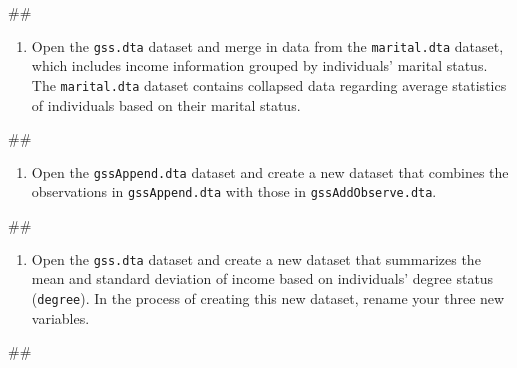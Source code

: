 \documentclass[
]{book}
\newenvironment{Shaded}{\begin{snugshade}}{\end{snugshade}}
\newcommand{\NormalTok}[1]{#1}
\providecommand{\tightlist}{%
  \setlength{\itemsep}{0pt}\setlength{\parskip}{0pt}}
\begin{document}
\begin{Shaded}
\begin{Highlighting}[]
\NormalTok{\#\#}
\end{Highlighting}
\end{Shaded}

\begin{enumerate}
\def\labelenumi{\arabic{enumi}.}
\setcounter{enumi}{1}
\tightlist
\item
  Open the \texttt{gss.dta} dataset and merge in data from the \texttt{marital.dta} dataset, which includes income information grouped by individuals' marital status. The \texttt{marital.dta} dataset contains collapsed data regarding average statistics of individuals based on their marital status.
\end{enumerate}

\begin{Shaded}
\begin{Highlighting}[]
\NormalTok{\#\#}
\end{Highlighting}
\end{Shaded}

\begin{enumerate}
\def\labelenumi{\arabic{enumi}.}
\setcounter{enumi}{2}
\tightlist
\item
  Open the \texttt{gssAppend.dta} dataset and create a new dataset that combines the observations in \texttt{gssAppend.dta} with those in \texttt{gssAddObserve.dta}.
\end{enumerate}

\begin{Shaded}
\begin{Highlighting}[]
\NormalTok{\#\#}
\end{Highlighting}
\end{Shaded}

\begin{enumerate}
\def\labelenumi{\arabic{enumi}.}
\setcounter{enumi}{3}
\tightlist
\item
  Open the \texttt{gss.dta} dataset and create a new dataset that summarizes the mean and standard deviation of income based on individuals' degree status (\texttt{degree}). In the process of creating this new dataset, rename your three new variables.
\end{enumerate}

\begin{Shaded}
\begin{Highlighting}[]
\NormalTok{\#\#}
\end{Highlighting}
\end{Shaded}
\end{document}
